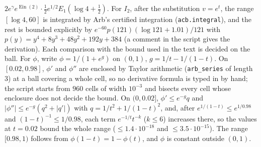 $2e^\gamma e^{\operatorname{Ein}(2)}\cdot\frac12e^{1/2}E_1(\log4+\frac12)$. For $I_2$, after the substitution $v=e^t$, the range
$[\log4,60]$ is integrated by Arb's certified integration (\texttt{acb.integral}), and the rest is bounded explicitly by
$e^{-60}p(121)(\log121+1.01)/121$ with $p(y)=y^4+8y^3+48y^2+192y+384$ (a comment in the script gives the derivation). Each
comparison with the bound used in the text is decided on the ball.
For $\phi$, write $\phi=1/(1+e^g)$ on $(0,1)$, $g=1/t-1/(1-t)$. On $[0.02,0.98]$, $\phi'$ and $\phi''$ are enclosed by Taylor
arithmetic (\texttt{arb\_series} of length $3$) at a ball covering a whole cell, so no derivative formula is typed in by hand; the
script starts from $960$ cells of width $10^{-3}$ and bisects every cell whose enclosure does not decide the bound. On $(0,0.02]$,
$\phi'\le e^{-g}q$ and $|\phi''|\le e^{-g}(q^2+|q'|)$ with $q=1/t^2+1/(1-t)^2$, and, after $e^{1/(1-t)}\le e^{1/0.98}$ and $(1-t)^{-1}\le1/0.98$, each term $e^{-1/t}t^{-k}$ ($k\le6$) increases there, so the values at $t=0.02$ bound the whole range ($\le1.4\cdot10^{-18}$ and $\le3.5\cdot10^{-15}$). The range $[0.98,1)$
follows from $\phi(1-t)=1-\phi(t)$, and $\phi$ is constant outside $(0,1)$.

